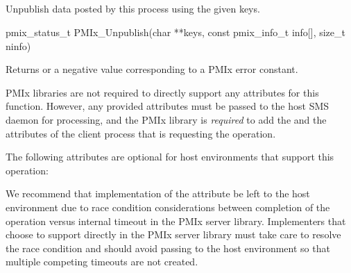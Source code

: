 \subsection{}

\summary

Unpublish data posted by this process using the given keys.

\format

\cspecificstart
\begin{codepar}
pmix_status_t
PMIx_Unpublish(char **keys,
               const pmix_info_t info[], size_t ninfo)
\end{codepar}
\cspecificend

\begin{arglist}
\end{arglist}

Returns  or a negative value corresponding to a PMIx error constant.

\reqattrstart
\ac{PMIx} libraries are not required to directly support any attributes for this function. However, any provided attributes must be passed to the host \ac{SMS} daemon for processing, and the \ac{PMIx} library is \textit{required} to add the  and the  attributes of the client process that is requesting the operation.

\reqattrend

\optattrstart
The following attributes are optional for host environments that support this operation:


\optattrend

\adviceimplstart
We recommend that implementation of the  attribute be left to the host environment due to race condition considerations between completion of the operation versus internal timeout in the \ac{PMIx} server library. Implementers that choose to support  directly in the \ac{PMIx} server library must take care to resolve the race condition and should avoid passing  to the host environment so that multiple competing timeouts are not created.
\adviceimplend


\descr

